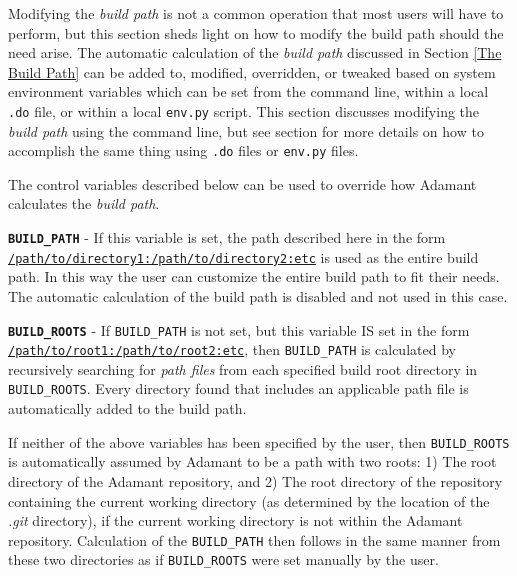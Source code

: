 Modifying the \textit{build path} is not a common operation that most users will have to perform, but this section sheds light on how to modify the build path should the need arise. The automatic calculation of the \textit{build path} discussed in Section \ref{The Build Path} can be added to, modified, overridden, or tweaked based on system environment variables which can be set from the command line, within a local \texttt{.do} file, or within a local \texttt{env.py} script. This section discusses modifying the \textit{build path} using the command line, but see section \label{Setting the Environment} for more details on how to accomplish the same thing using \texttt{.do} files or \texttt{env.py} files. 

The control variables described below can be used to override how Adamant calculates the \textit{build path}.

\vspace{5mm} %
\begin{spaceditemize}
  \item \textbf{\texttt{BUILD\_PATH}} - If this variable is set, the path described here in the form \texttt{\url{/path/to/directory1:/path/to/directory2:etc}} is used as the entire build path. In this way the user can customize the entire build path to fit their needs. The automatic calculation of the build path is disabled and not used in this case.
  \item \textbf{\texttt{BUILD\_ROOTS}} - If \texttt{BUILD\_PATH} is not set, but this variable IS set in the form \texttt{\url{/path/to/root1:/path/to/root2:etc}}, then \texttt{BUILD\_PATH} is calculated by recursively searching for \textit{path files} from each specified build root directory in \texttt{BUILD\_ROOTS}. Every directory found that includes an applicable path file is automatically added to the build path. 
\end{spaceditemize}
\vspace{5mm} %

If neither of the above variables has been specified by the user, then \texttt{BUILD\_ROOTS} is automatically assumed by Adamant to be a path with two roots: 1) The root directory of the Adamant repository, and 2) The root directory of the repository containing the current working directory (as determined by the location of the \textit{.git} directory), if the current working directory is not within the Adamant repository. Calculation of the \texttt{BUILD\_PATH} then follows in the same manner from these two directories as if \texttt{BUILD\_ROOTS} were set manually by the user.

